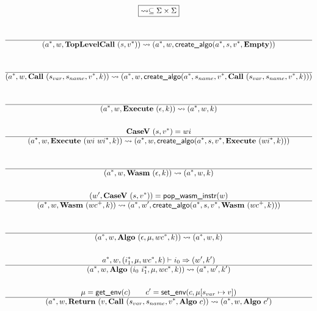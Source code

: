\begin{gather*}
\boxed{\leadsto \subseteq \Sigma \times \Sigma} \\
%
\newline \\
  \\
  \hline
  (\seq{a}, w, \toplevelcall ~ (s, \seq v)) \leadsto (\seq{a}, w, \createalgo(\seq a, s, \seq v, \mt)) \\
%
\newline \\
  \\
  \hline
  (\seq{a}, w, \call ~ (s_{var}, s_{name}, \seq v, k)) \leadsto
  (\seq{a}, w, \createalgo(\seq a, s_{name}, \seq v, \call ~ (s_{var}, s_{name}, \seq v, k))) \\
%
\newline \\
  \\
  \hline
  (\seq{a}, w, \exe ~ (\epsilon, k)) \leadsto (\seq{a}, w, k) \\
%
\newline \\
  \casev ~ (s, \seq v) = wi \\
  \hline
  (\seq{a}, w, \exe ~ (wi ~ \seq{wi}, k)) \leadsto
  (\seq{a}, w, \createalgo(\seq a, s, \seq v, \exe ~ (\seq{wi}, k))) \\
%
\newline \\
  \\
  \hline
  (\seq{a}, w, \wasm ~ (\epsilon, k)) \leadsto (\seq{a}, w, k) \\
%
\newline \\
  (w', \casev ~ (s, \seq v)) = \popwasminstr(w) \\
  \hline
  (\seq{a}, w, \wasm ~ (wc^+, k))
  \leadsto
  (\seq{a}, w', \createalgo(\seq a, s, \seq v, \wasm ~ (wc^+, k))) \\
%
\newline \\
  \\
  \hline
  (\seq{a}, w, \algo ~ (\epsilon, \mu, \seq{wc}, k)) \leadsto (\seq{a}, w, k) \\
%
\newline \\
  \seq{a}, w, (\seq{i_1}, \mu, \seq{wc}, k) \vdash i_0 \Rightarrow (w', k') \\
  \hline
  (\seq{a}, w, \algo ~ (i_0 ~ \seq{i_1}, \mu, \seq{wc}, k)) \leadsto (\seq{a}, w', k') \\
%
\newline \\
  \mu = \getenv(c) \qquad c' = \setenv(c, \mu[s_{var} \mapsto v]) \\
  \hline
  (\seq{a}, w, \ret ~ (v, \call ~ (s_{var}, s_{name}, \seq v, \algo ~ c)) \leadsto
  (\seq a, w, \algo ~ c') \\
\end{gather*}

